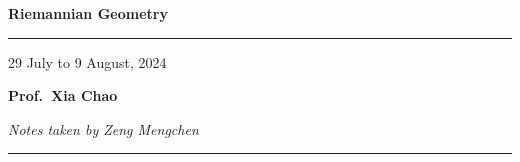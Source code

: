 \documentclass[]{book}
\theoremstyle{definition}
\theoremstyle{plain}
\theoremstyle{remark}
\begin{document}
\begin{titlepage}
    \vglue 5cm
    {\setlength{\parskip}{4pt}
    \par
    {\LARGE\bfseries\noindent Riemannian Geometry}}
    \vspace{2pt}
    \hrule depth4pt
    \begin{flushright}
        29 July to 9 August, 2024
    \end{flushright}
    \vfill
    {\setlength{\parskip}{4pt}
    \large{\bfseries Prof.\ Xia Chao}\par
    {\noindent\itshape Notes taken by Zeng Mengchen}}
    \hrule depth2pt
\end{titlepage}

\frontmatter
\tableofcontents
{}
% 

\mainmatter









\appendix

\printindex
\end{document}
